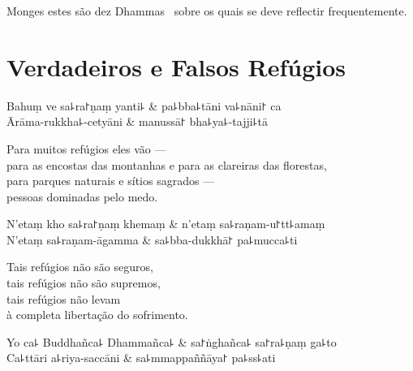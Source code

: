 \begin{english}
  Monges estes são dez Dhammas \pause\ sobre os quais se deve reflectir frequentemente.
\end{english}

\chapter{Verdadeiros e Falsos Refúgios}


\begin{leader}
\end{leader}

\begin{twochants}
  Bahuṃ ve sa꜕ra꜓ṇaṃ yanti꜕ & pa꜕bba꜕tāni va꜕nāni꜓ ca \\
  Ārāma-rukkha꜕-cetyāni & manussā꜓ bha꜕ya꜕-tajji꜕tā \\
\end{twochants}

\begin{english}
  Para muitos refúgios eles vão ---\\
  para as encostas das montanhas e para as clareiras das florestas,\\
  para parques naturais e sítios sagrados ---\\
  pessoas dominadas pelo medo.
\end{english}

\begin{twochants}
  N'etaṃ kho sa꜕ra꜓ṇaṃ khemaṃ & n'etaṃ sa꜕raṇam-u꜓tt꜕amaṃ \\
  N'etaṃ sa꜕raṇam-āgamma & sa꜕bba-dukkhā꜓ pa꜕mucca꜕ti \\
\end{twochants}

\begin{english}
  Tais refúgios não são seguros,\\
  tais refúgios não são supremos,\\
  tais refúgios não levam\\
  à completa libertação do sofrimento.
\end{english}

\begin{twochants}
  Yo ca꜕ Buddhañca꜕ Dhammañca꜕ & sa꜓ṅghañca꜕ sa꜓ra꜕ṇaṃ ga꜕to \\
  Ca꜕ttāri a꜕riya-saccāni & sa꜕mmappaññāya꜓ pa꜕ss꜕ati \\
\end{twochants}


